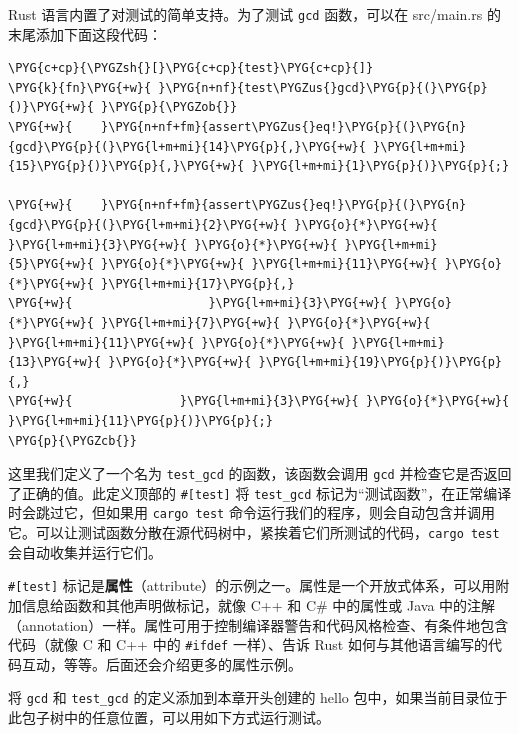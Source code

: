 Rust 语言内置了对测试的简单支持。为了测试 \texttt{gcd} 函数，可以在 src/main.rs 的末尾添加下面这段代码：

\begin{Verbatim}[commandchars=\\\{\},breaklines=true,breakanywhere=true,fontsize=\codefont,xleftmargin=17bp]
\PYG{c+cp}{\PYGZsh{}[}\PYG{c+cp}{test}\PYG{c+cp}{]}
\PYG{k}{fn}\PYG{+w}{ }\PYG{n+nf}{test\PYGZus{}gcd}\PYG{p}{(}\PYG{p}{)}\PYG{+w}{ }\PYG{p}{\PYGZob{}}
\PYG{+w}{    }\PYG{n+nf+fm}{assert\PYGZus{}eq!}\PYG{p}{(}\PYG{n}{gcd}\PYG{p}{(}\PYG{l+m+mi}{14}\PYG{p}{,}\PYG{+w}{ }\PYG{l+m+mi}{15}\PYG{p}{)}\PYG{p}{,}\PYG{+w}{ }\PYG{l+m+mi}{1}\PYG{p}{)}\PYG{p}{;}

\PYG{+w}{    }\PYG{n+nf+fm}{assert\PYGZus{}eq!}\PYG{p}{(}\PYG{n}{gcd}\PYG{p}{(}\PYG{l+m+mi}{2}\PYG{+w}{ }\PYG{o}{*}\PYG{+w}{ }\PYG{l+m+mi}{3}\PYG{+w}{ }\PYG{o}{*}\PYG{+w}{ }\PYG{l+m+mi}{5}\PYG{+w}{ }\PYG{o}{*}\PYG{+w}{ }\PYG{l+m+mi}{11}\PYG{+w}{ }\PYG{o}{*}\PYG{+w}{ }\PYG{l+m+mi}{17}\PYG{p}{,}
\PYG{+w}{                   }\PYG{l+m+mi}{3}\PYG{+w}{ }\PYG{o}{*}\PYG{+w}{ }\PYG{l+m+mi}{7}\PYG{+w}{ }\PYG{o}{*}\PYG{+w}{ }\PYG{l+m+mi}{11}\PYG{+w}{ }\PYG{o}{*}\PYG{+w}{ }\PYG{l+m+mi}{13}\PYG{+w}{ }\PYG{o}{*}\PYG{+w}{ }\PYG{l+m+mi}{19}\PYG{p}{)}\PYG{p}{,}
\PYG{+w}{               }\PYG{l+m+mi}{3}\PYG{+w}{ }\PYG{o}{*}\PYG{+w}{ }\PYG{l+m+mi}{11}\PYG{p}{)}\PYG{p}{;}
\PYG{p}{\PYGZcb{}}
\end{Verbatim}

这里我们定义了一个名为 \texttt{test\_gcd} 的函数，该函数会调用 \texttt{gcd} 并检查它是否返回了正确的值。此定义顶部的 \texttt{\#[test]} 将 \texttt{test\_gcd} 标记为“测试函数”，在正常编译时会跳过它，但如果用 \texttt{cargo test} 命令运行我们的程序，则会自动包含并调用它。可以让测试函数分散在源代码树中，紧挨着它们所测试的代码，\texttt{cargo test} 会自动收集并运行它们。

\texttt{\#[test]} 标记是\textbf{属性}（attribute）的示例之一。属性是一个开放式体系，可以用附加信息给函数和其他声明做标记，就像 C++ 和 C\# 中的属性或 Java 中的注解（annotation）一样。属性可用于控制编译器警告和代码风格检查、有条件地包含代码（就像 C 和 C++ 中的 \texttt{\#ifdef} 一样）、告诉 Rust 如何与其他语言编写的代码互动，等等。后面还会介绍更多的属性示例。

将 \texttt{gcd} 和 \texttt{test\_gcd} 的定义添加到本章开头创建的 hello 包中，如果当前目录位于此包子树中的任意位置，可以用如下方式运行测试。

